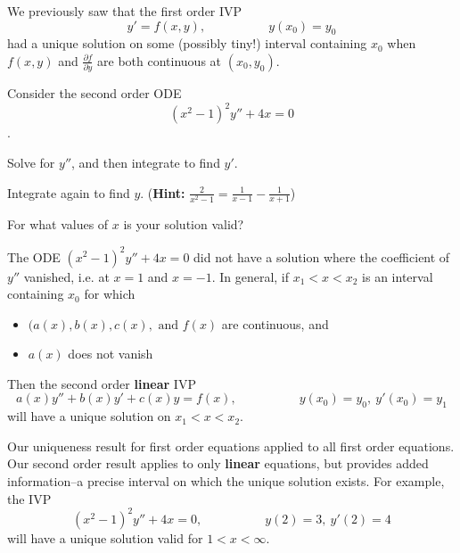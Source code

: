 \begin{applicationActivities}

\begin{observation}
We previously saw that the first order IVP
\[ y'=f(x,y), \hspace{5em} y(x_0)=y_0 \]
had a unique solution on some (possibly tiny!) interval containing \(x_0\) when \(f(x,y)\) and \(\frac{\partial f}{\partial y}\) are both continuous at \((x_0,y_0)\).
\vfill
\end{observation}

\begin{activity}{10}
Consider the second order ODE 
\[(x^2-1)^2y''+4x=0\].
\begin{subactivity}
Solve for \(y''\), and then integrate to find \(y'\).
\end{subactivity}
\begin{subactivity}
Integrate again to find \(y\). ({\bf Hint: } \(\frac{2}{x^2-1}=\frac{1}{x-1}-\frac{1}{x+1}\))
\end{subactivity}
\begin{subactivity}
For what values of \(x\) is your solution valid?
\end{subactivity}
\end{activity}

\begin{observation}
The ODE \( (x^2-1)^2y''+4x=0\) did not have a solution where the coefficient of \(y''\) vanished, i.e. at \(x=1\) and \(x=-1\).
\vfill
In general, if \(x_1 < x < x_2\) is an interval containing \(x_0\) for which
\begin{itemize}
\item \((a(x),b(x),c(x),\text{ and } f(x)\) are continuous, and
\item \( a(x)\) does not vanish
\end{itemize}
Then the second order {\bf linear} IVP
\[ a(x)y''+b(x)y'+c(x)y=f(x), \hspace{5em} y(x_0)=y_0,\ y'(x_0)=y_1 \]
will have a unique solution on \(x_1<x<x_2\).
\end{observation}

\begin{observation}
Our uniqueness result for first order equations applied to all first order equations.  Our second order result applies to only {\bf linear} equations, but provides added information--a precise interval on which the unique solution exists.
\vfill
For example, the IVP 
\[ (x^2-1)^2y''+4x=0 , \hspace{5em} y(2)=3,\ y'(2)=4\]
will have a unique solution valid for \(1<x<\infty\).
\end{observation}



\end{applicationActivities}
